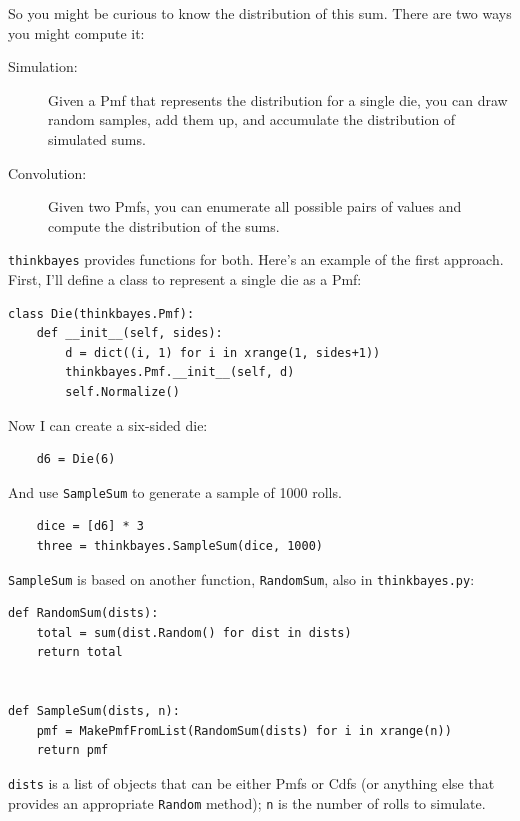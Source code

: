 \documentclass[12pt]{book}
\begin{document}
So you might be curious to know the distribution of this sum.
There are two ways you might compute it:

\begin{description}

\item[Simulation:] Given a Pmf that represents the distribution
for a single die, you can draw random samples, add them up,
and accumulate the distribution of simulated sums.

\item[Convolution:] Given two Pmfs, you can enumerate all possible
pairs of values and compute the distribution of the sums.

\end{description}

\verb"thinkbayes" provides functions for both.  Here's an example
of the first approach.  First, I'll define a class to represent
a single die as a Pmf:

\begin{verbatim}
class Die(thinkbayes.Pmf):
    def __init__(self, sides):
        d = dict((i, 1) for i in xrange(1, sides+1))
        thinkbayes.Pmf.__init__(self, d)
        self.Normalize()
\end{verbatim}

Now I can create a six-sided die:

\begin{verbatim}
    d6 = Die(6)
\end{verbatim}

And use \verb"SampleSum" to generate a sample of 1000 rolls.

\begin{verbatim}
    dice = [d6] * 3
    three = thinkbayes.SampleSum(dice, 1000)
\end{verbatim}

\verb"SampleSum" is based on another function, \verb"RandomSum",
also in \verb"thinkbayes.py":

\begin{verbatim}
def RandomSum(dists):
    total = sum(dist.Random() for dist in dists)
    return total


def SampleSum(dists, n):
    pmf = MakePmfFromList(RandomSum(dists) for i in xrange(n))
    return pmf
\end{verbatim}

\verb"dists" is a list of objects that can be either
Pmfs or Cdfs (or anything else that provides an appropriate
\verb"Random" method); \verb"n" is the number of rolls to simulate.
\end{document}
